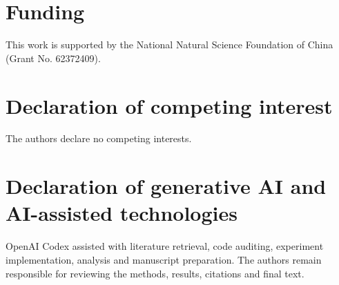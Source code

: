 \section*{Funding}
This work is supported by the National Natural Science Foundation of China
(Grant No. 62372409).
\section*{Declaration of competing interest}
The authors declare no competing interests.
\section*{Declaration of generative AI and AI-assisted technologies}
OpenAI Codex assisted with literature retrieval, code auditing, experiment implementation,
analysis and manuscript preparation. The authors remain responsible for reviewing the
methods, results, citations and final text.
